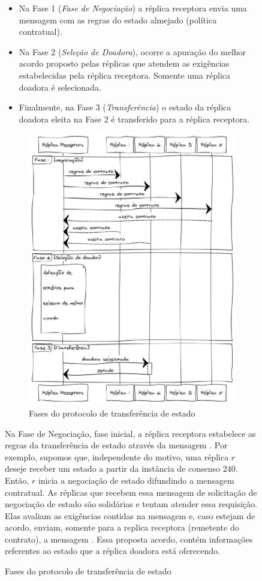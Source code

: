 \begin{figure}[ht]
\begin{itemize}
  \item Na Fase 1 (\emph{Fase de Negociação}) a réplica receptora envia uma mensagem com
    as regras do estado almejado (política contratual).
  \item Na Fase 2 (\emph{Seleção de Doadora}), ocorre a apuração do melhor acordo proposto
    pelas réplicas que atendem as exigências estabelecidas pela réplica receptora. Somente
    uma réplica doadora é selecionada.
  \item Finalmente, na Fase 3 (\emph{Transferência}) o estado da réplica doadora eleita na
    Fase 2 é transferido para a réplica receptora.
\end{itemize}

\begin{figure}[ht]
  \centering
  \includegraphics[width=11cm]{conteudo/capitulos/figuras/fases_protocolo.eps}
  \caption{Fases do protocolo de transferência de estado}
  \label{fig:fases_protocolo}
\end{figure}

Na Fase de Negociação, fase inicial, a réplica receptora estabelece as regras da
transferência de estado através da mensagem . Por exemplo,
supomos que, independente do motivo, uma réplica $r$ deseje receber um estado a partir da
instância de consenso $240$. Então, $r$ inicia a negociação de estado difundindo a
mensagem contratual. As réplicas que recebem essa mensagem de solicitação de negociação de
estado são solidárias e tentam atender essa requisição. Elas avaliam as exigências
contidas na mensagem e, caso estejam de acordo, enviam, somente para a replica receptora
(remetente do contrato), a mensagem . Essa proposta acordo, contém
informações referentes ao estado que a réplica doadora está oferecendo.


\end{figure}
